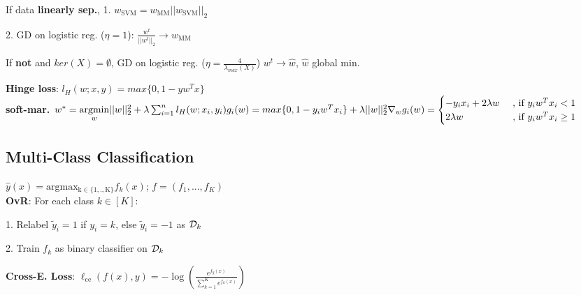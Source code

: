 If data \textbf{linearly sep.}, 1. \(w_{\text{SVM}} = w_{\text{MM}}||w_{\text{SVM}}||_2\)

2. GD on logistic reg. (\(\eta = 1\)): \(\frac{w^t}{||w^t||_2} \to w_{\text{MM}}\) 

If \textbf{not} and \(ker(X) = \emptyset\), GD on logistic reg. (\(\eta = \frac{4}{\lambda_{max}(X)}\))
\(w^t \to \hat{w}\), \(\hat{w}\) global min.

\textbf{Hinge loss}: $l_H(w;x,y) = max \{0,1-y w^T x\}$\\
\textbf{soft-mar.}
$w^* = \underset{w}{\operatorname{argmin}} ||w||_2^2 + \lambda\sum_{i=1}^nl_H(w;x_i,y_i)\\
g_i(w) = max \{0,1-y_i w^T x_i\} + \lambda ||w||_2^2\\
\nabla_w g_i(w) = \begin{cases}
    -y_i x_i + 2\lambda w &\text{ , if $y_i w^T x_i<1$}\\
		2\lambda w &\text{ , if $y_i w^T x_i \geq 1$}
\end{cases}$



\subsection*{Multi-Class Classification}
\(\hat{y}(x)=\operatorname{argmax_{k \in \{1,.,K\}}}f_k(x)\); \(f = (f_1, ..., f_K)\)\\
\textbf{OvR}: For each class \(k \in [K]\):

1. Relabel \(\tilde{y}_i = 1\) if \(y_i = k\), else \(\tilde{y}_i = -1\) as \(\mathcal{D}_k\)

2. Train \(f_k\) as binary classifier on \(\mathcal{D}_k\) 

\textbf{Cross-E. Loss}: \(\ell_{\text{ce}}(f(x), y) = -\log\left(\frac{e^{f_y(x)}}{\sum_{k=1}^Ke^{f_k(x)}}\right)\)

